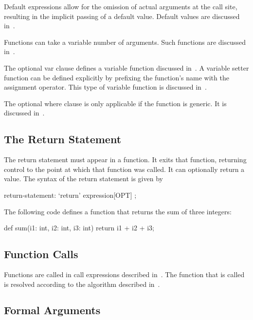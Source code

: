 Default expressions allow for the omission of actual arguments at the
call site, resulting in the implicit passing of a default value.
Default values are discussed in~.

Functions can take a variable number of arguments.  Such functions are
discussed in~.

The optional var clause defines a variable function discussed
in~.  A variable setter function can be
defined explicitly by prefixing the function's name with the
assignment operator.  This type of variable function is discussed
in~.

The optional where clause is only applicable if the function is
generic.  It is discussed in~.

\subsection{The Return Statement}
\label{The_Return_Statement}

The return statement must appear in a function.  It exits that
function, returning control to the point at which that function was
called.  It can optionally return a value.  The syntax of the return
statement is given by
\begin{syntax}
return-statement:
  `return' expression[OPT] ;
\end{syntax}

\begin{example}
The following code defines a function that returns the sum of three
integers:
\begin{chapel}
def sum(i1: int, i2: int, i3: int)
  return i1 + i2 + i3;
\end{chapel}
\end{example}

\subsection{Function Calls}
\label{Function_Calls}

Functions are called in call expressions described
in~.  The function that is called is resolved
according to the algorithm described in~.

\subsection{Formal Arguments}
\label{Formal_Arguments}

